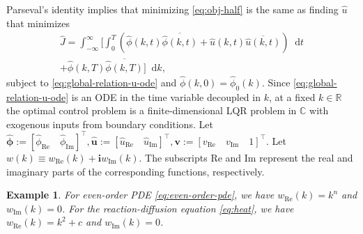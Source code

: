 \documentclass[journal,twoside,web]{ieeecolor}
\newtheorem{example}{Example}
\newcommand{\RR}{\mathbb{R}}
\newcommand{\CC}{\mathbb{C}}
\newcommand{\state}{\phi}
\newcommand{\statehat}{\hat{\state}}
\newcommand{\im}{\mathbf{i}}
\newcommand*\diff{\mathop{}\!\mathrm{d}}
\begin{document}
Parseval's identity implies that minimizing \eqref{eq:obj-half} is the same as finding $\hat{u}$ that minimizes
\begin{multline}\label{eq:obj-transform-half}
		\hat{J}=\int_{-\infty}^{\infty}\Big[\int_0^T\left( \statehat(k,t)\overline{\statehat(k,t)}+\hat{u}(k,t)\overline{\hat{u}(k,t)}\right)\diff t \\ + \statehat(k,T)\overline{\statehat(k,T)}\Big]\diff k,
\end{multline}
subject to \eqref{eq:global-relation-u-ode} and $\statehat(k,0)=\statehat_0(k).$ Since \eqref{eq:global-relation-u-ode} is an ODE in the time variable decoupled in $k$, at a fixed $k\in\RR$ the optimal control problem is a finite-dimensional LQR problem in $\CC$ with exogenous inputs from boundary conditions.
Let $\boldsymbol{\statehat}:= [\statehat_{\text{Re}}\quad \statehat_{\text{Im}}]^\top,\boldsymbol{\hat{u}}:=[\hat{u}_{\text{Re}}\quad\hat{u}_{\text{Im}}]^\top,\boldsymbol{v}:=[v_{\text{Re}}\quad v_{\text{Im}} \quad 1]^\top$. Let $w(k)\equiv w_{\text{Re}}(k) +\im w_{\text{Im}}(k)$. The subscripts Re and Im represent the real and imaginary parts of the corresponding functions, respectively.
\begin{example}
	\label{ex:w-real-imaginary}
	For even-order PDE \eqref{eq:even-order-pde}, we have $w_{\text{Re}}(k) = k^n$ and $w_{\text{Im}}(k) = 0$.
	 For the reaction-diffusion equation \eqref{eq:heat}, we have $w_{\text{Re}}(k) = k^2+c$ and $w_{\text{Im}}(k) = 0$.
\end{example}
\end{document}
